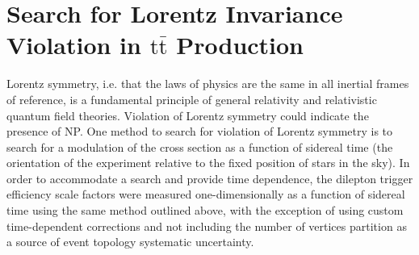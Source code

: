 \section{Search for Lorentz Invariance Violation in \ensuremath{\mathrm{t\bar{t}}} Production}
Lorentz symmetry, i.e. that the laws of physics are the same in all inertial frames of reference, is a fundamental principle of general relativity and relativistic quantum field theories.
Violation of Lorentz symmetry could indicate the presence of NP.
One method to search for violation of Lorentz symmetry is to search for a modulation of the \ttbar cross section as a function of sidereal time (the orientation of the experiment relative to the fixed position of stars in the sky).
In order to accommodate a search and provide time dependence, the dilepton trigger efficiency scale factors were measured one-dimensionally as a function of sidereal time using the same method outlined above, with the exception of using custom time-dependent corrections and not including the number of vertices partition as a source of event topology systematic uncertainty.

